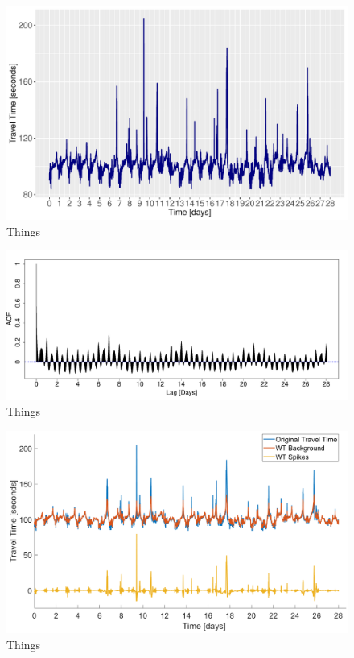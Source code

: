\documentclass[letterpaper, 10 pt, conference]{ieeeconf}  %
\begin{document}
\begin{figure}[htbp]
	\centerline{\includegraphics[width=\linewidth]{./images/Travel_Time.pdf}}
	\caption{Things}
	\label{fig:travel_time}
\end{figure}

\begin{figure}[htbp]
	\centerline{\includegraphics[width=\linewidth]{./images/ACF_M6_Link3.pdf}}
	\caption{Things}
	\label{fig:ACF}
\end{figure}


\begin{figure}[htbp]
	\centerline{\includegraphics[width=\linewidth]{./images/Splitting.png}}
	\caption{Things}
	\label{fig:splitting}
\end{figure}
\end{document}
